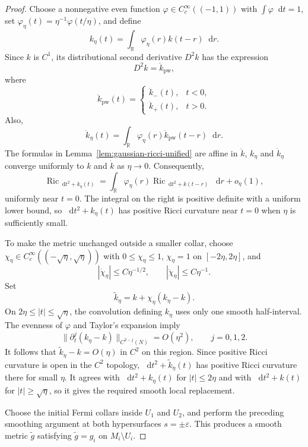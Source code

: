 \documentclass[11pt,reqno]{amsart}
\theoremstyle{definition}
\numberwithin{equation}{section}
\DeclareMathOperator{\Ric}{Ric}
\newcommand{\dd}{\mathop{}\!\mathrm d}
\begin{document}
\begin{proof}
Choose a nonnegative even function
$\varphi\in C_c^\infty((-1,1))$ with $\int\varphi\dd t=1$, set
$\varphi_\eta(t)=\eta^{-1}\varphi(t/\eta)$, and define
\[
 k_\eta(t)=\int_{\mathbb R}\varphi_\eta(r)k(t-r)\dd r.
\]
Since $k$ is $C^1$, its distributional second derivative $D^2 k$ has the expression
\[
D^2 k=\ddot{k}_{\mathrm{pw}},
\]
where
\[
\ddot{k}_{\mathrm{pw}}(t)= \begin{cases}\ddot{k}_{-}(t), & t<0, \\ \ddot{k}_{+}(t), & t>0 .\end{cases}
\]
Also,
\begin{equation}
 \ddot k_\eta(t)
   =\int_{\mathbb R}\varphi_\eta(r)\ddot{k}_{\mathrm{pw}}(t-r)\dd r.
\label{eq:mollified-second-derivative}
\end{equation}
The formulas in Lemma~\ref{lem:gaussian-ricci-unified} are affine in
$\ddot k$, $k_\eta$ and $\dot k_\eta$ converge
uniformly to $k$ and $\dot k$ as $\eta\to0$.  Consequently,
\begin{equation}
 \Ric_{\dd t^2+k_\eta(t)}
 =\int_{\mathbb R}\varphi_\eta(r)
      \Ric_{\dd t^2+k(t-r)}\dd r+o_\eta(1),
                                                        \label{eq:mollified-ricci}
\end{equation}
uniformly near $t=0$.  The integral on the right is positive definite
with a uniform lower bound, so $\dd t^2+k_\eta(t)$ has positive Ricci
curvature near $t=0$ when $\eta$ is sufficiently small.

To make the metric unchanged outside a smaller collar, choose
$\chi_\eta\in C_c^\infty((-\sqrt\eta,\sqrt\eta))$ with
$0\le\chi_\eta\le1$, $\chi_\eta=1$ on $[-2\eta,2\eta]$, and
\[
 |\dot\chi_\eta|\le C\eta^{-1/2},
 \qquad |\ddot\chi_\eta|\le C\eta^{-1}.
\]
Set
\[
 \widetilde k_\eta
   =k+\chi_\eta(k_\eta-k).
\]
On $2\eta\le|t|\le\sqrt\eta$, the convolution defining $k_\eta$ uses
only one smooth half-interval.  The evenness of $\varphi$ and Taylor's
expansion imply
\[
 \|\partial_t^j(k_\eta-k)\|_{C^{2-j}(N)}=O(\eta^2),
 \qquad j=0,1,2.
\]
It follows that $\widetilde k_\eta-k=O(\eta)$ in $C^2$ on this region.
Since positive Ricci curvature is open in the $C^2$ topology,
$\dd t^2+\widetilde k_\eta(t)$ has positive Ricci curvature there for
small $\eta$.  It agrees with $\dd t^2+k_\eta(t)$ for $|t|\le2\eta$
and with $\dd t^2+k(t)$ for $|t|\ge\sqrt\eta$, so it gives the required
smooth local replacement.

Choose the initial Fermi collars inside $U_1$ and $U_2$, and perform the
preceding smoothing argument at both hypersurfaces $s=\pm\varepsilon$.  This
produces a smooth metric $\widetilde g$ satisfying
$\widetilde g=g_i$ on $M_i\setminus U_i$.


\end{proof}
\end{document}
